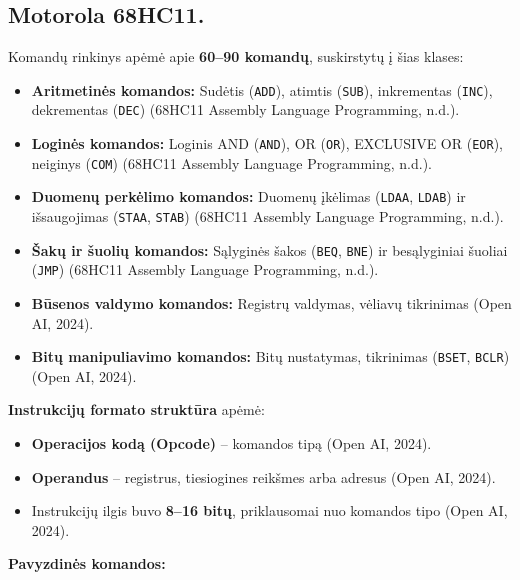 \documentclass[a4paper,12pt]{article}
\begin{document}
\subsection{Motorola 68HC11.}
Komandų rinkinys apėmė apie \textbf{60–90 komandų}, suskirstytų į šias klases:
\begin{itemize}
    \item \textbf{Aritmetinės komandos:} Sudėtis (\texttt{ADD}), atimtis (\texttt{SUB}), inkrementas (\texttt{INC}), dekrementas (\texttt{DEC}) (68HC11 Assembly Language Programming, n.d.).
    \item \textbf{Loginės komandos:} Loginis AND (\texttt{AND}), OR (\texttt{OR}), EXCLUSIVE OR (\texttt{EOR}), neiginys (\texttt{COM}) (68HC11 Assembly Language Programming, n.d.).
    \item \textbf{Duomenų perkėlimo komandos:} Duomenų įkėlimas (\texttt{LDAA}, \texttt{LDAB}) ir išsaugojimas (\texttt{STAA}, \texttt{STAB}) (68HC11 Assembly Language Programming, n.d.).
    \item \textbf{Šakų ir šuolių komandos:} Sąlyginės šakos (\texttt{BEQ}, \texttt{BNE}) ir besąlyginiai šuoliai (\texttt{JMP}) (68HC11 Assembly Language Programming, n.d.).
    \item \textbf{Būsenos valdymo komandos:} Registrų valdymas, vėliavų tikrinimas (Open AI, 2024).
    \item \textbf{Bitų manipuliavimo komandos:} Bitų nustatymas, tikrinimas (\texttt{BSET}, \texttt{BCLR}) (Open AI, 2024).
\end{itemize}
\textbf{Instrukcijų formato struktūra} apėmė:
\begin{itemize}
    \item \textbf{Operacijos kodą (Opcode)} – komandos tipą (Open AI, 2024).
    \item \textbf{Operandus} – registrus, tiesiogines reikšmes arba adresus (Open AI, 2024).
    \item Instrukcijų ilgis buvo \textbf{8–16 bitų}, priklausomai nuo komandos tipo (Open AI, 2024).
\end{itemize}
\textbf{Pavyzdinės komandos:}
\end{document}
